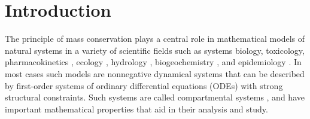 %


%
%
%
%


\section{Introduction}
The principle of mass conservation plays a central role in mathematical models
of natural systems in a variety of scientific fields such as systems biology,
toxicology, pharmacokinetics \citep{Anderson1983}, ecology
\citep{Eriksson1971ARoEaS, Rodhe1979Tellus, Matis1979, Manzoni2009SBB},
hydrology \citep{Nash1957IASH, Botter2011GRL, Harman2014GRL}, biogeochemistry
\citep{Manzoni2009SBB, Sierra2015EM}, and epidemiology \citep{Jacquez1993SIAM}.
In most cases such models are nonnegative dynamical systems that can be
described by first-order systems of ordinary differential equations (ODEs) with
strong structural constraints.  Such systems are called compartmental systems
\citep{Anderson1983, Jacquez1993SIAM, Walter1999, Haddad2010}, and have
important mathematical properties that aid in their analysis and study.

